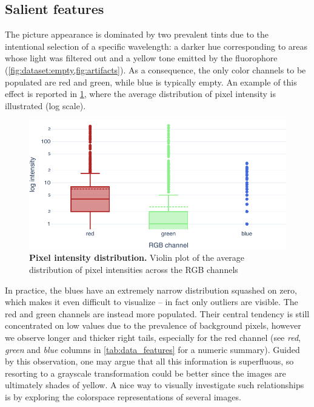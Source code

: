 \subsection{Salient features}
\label{sec:data_features}

The picture appearance is dominated by two prevalent tints due to the intentional selection of a specific wavelength: a darker hue corresponding to areas whose light was filtered out and a yellow tone emitted by the fluorophore
(\cref{fig:dataset:empty,fig:artifacts}).
As a consequence, the only color channels to be populated are red and green, while blue is typically empty. 
An example of this effect is reported in \cref{fig:dataset:pixel_intensity}, where the average distribution of pixel intensity is illustrated (log scale).
\begin{figure}
    \centering
    \includegraphics[width=\textwidth]{figures/120_dataset/features/pixel_intensity_distribution.pdf}
    \caption{\textbf{Pixel intensity distribution.} Violin plot of the average distribution of pixel intensities across the  RGB channels}
    \label{fig:dataset:pixel_intensity}
\end{figure}
In practice, the blues have an extremely narrow distribution squashed on zero, which makes it even difficult to visualize -- in fact only outliers are visible. 
The red and green channels are instead more populated. Their central tendency is still concentrated on low values due to the prevalence of background pixels, however we observe longer and thicker right tails, especially for the red channel (see \textit{red}, \textit{green} and \textit{blue} columns in \cref{tab:data_features} for a numeric summary).
Guided by this observation, one may argue that all this information is superfluous, so resorting to a grayscale transformation could be better since the images are ultimately shades of yellow.
A nice way to visually investigate such relationships is by exploring the colorspace representations of several images.
